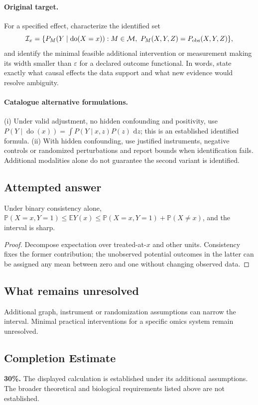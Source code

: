 \documentclass[11pt]{article}
\begin{document}
\paragraph{Original target.}
For a specified effect, characterize the identified set
\[
\mathcal I_x=\{P_M(Y\mid\operatorname{do}(X=x)):M\in\mathcal M,
\ P_M(X,Y,Z)=P_{\rm obs}(X,Y,Z)\},
\]
and identify the minimal feasible additional intervention or measurement making its width smaller than $\varepsilon$ for a declared outcome functional. In words, state exactly what causal effects the data support and what new evidence would resolve ambiguity.
\paragraph{Catalogue alternative formulations.}
(i) Under valid adjustment, no hidden confounding and positivity, use $P(Y\mid\operatorname{do}(x))=\int P(Y\mid x,z)P(z)\,\,\mathrm{d} z$; this is an established identified formula. (ii) With hidden confounding, use justified instruments, negative controls or randomized perturbations and report bounds when identification fails. Additional modalities alone do not guarantee the second variant is identified.
\subsection{Attempted answer}
\begin{proposition}
Under binary consistency alone, $\mathbb{P}(X=x,Y=1)\leq\mathbb{E} Y(x)\leq\mathbb{P}(X=x,Y=1)+\mathbb{P}(X\ne x)$, and the interval is sharp.
\end{proposition}
\begin{proof}
Decompose expectation over treated-at-$x$ and other units. Consistency fixes the former contribution; the unobserved potential outcomes in the latter can be assigned any mean between zero and one without changing observed data.
\end{proof}
\subsection{What remains unresolved}
Additional graph, instrument or randomization assumptions can narrow the interval. Minimal practical interventions for a specific omics system remain unresolved.
\subsection{Completion Estimate}
\textbf{30\%.} The displayed calculation is established under its additional assumptions. The broader theoretical and biological requirements listed above are not established.
\end{document}
